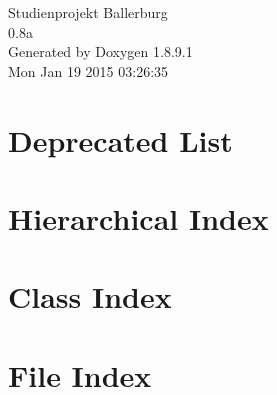 \documentclass[twoside]{book}
\newcommand{\+}{\discretionary{\mbox{\scriptsize$\hookleftarrow$}}{}{}}
\newcommand{\clearemptydoublepage}{%
  \newpage{\pagestyle{empty}\cleardoublepage}%
}
\begin{document}
\begin{titlepage}
\vspace*{7cm}
\begin{center}%
{\Large Studienprojekt Ballerburg \\[1ex]\large 0.\+8a }\\
\vspace*{1cm}
{\large Generated by Doxygen 1.8.9.1}\\
\vspace*{0.5cm}
{\small Mon Jan 19 2015 03:26:35}\\
\end{center}
\end{titlepage}
\clearemptydoublepage
\tableofcontents
\clearemptydoublepage
{}

\chapter{Deprecated List}
\label{deprecated}

\chapter{Hierarchical Index}

\chapter{Class Index}

\chapter{File Index}

\end{document}
